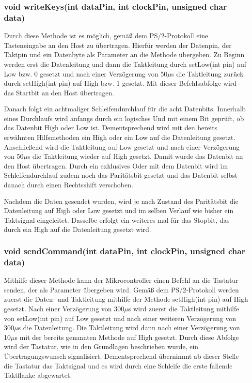 \subsubsection{void writeKeys(int dataPin, int clockPin, unsigned char data)}
Durch diese Methode ist es möglich, gemäß dem PS/2-Protokoll eine Tasteneingabe an den Host zu übertragen. Hierfür werden der Datenpin, der Taktpin und ein Datenbyte als Parameter an die Methode übergeben. Zu Beginn werden erst die Datenleitung und dann die Taktleitung durch setLow(int pin) auf Low bzw. 0 gesetzt und nach einer Verzögerung von 50$\mu$s die Taktleitung zurück durch setHigh(int pin) auf High bzw. 1 gesetzt. Mit dieser Befehlsabfolge wird das Startbit an den Host übertragen.

Danach folgt ein achtmaliger Schleifendurchlauf für die acht Datenbits. Innerhalb eines Durchlaufs wird anfangs durch ein logisches Und mit einem Bit geprüft, ob das Datenbit High oder Low ist. Dementsprechend wird mit den bereits erwähnten Hilfsmethoden ein High oder ein Low auf die Datenleitung gesetzt. Anschließend wird die Taktleitung auf Low gesetzt und nach einer Verzögerung von 50$\mu$s die Taktleitung wieder auf High gesetzt. Damit wurde das Datenbit an den Host übertragen. Durch ein exklusives Oder mit dem Datenbit wird im Schleifendurchlauf zudem noch das Paritätsbit gesetzt und das Datenbit selbst danach durch einen Rechtsshift verschoben.

Nachdem die Daten gesendet wurden, wird je nach Zustand des Paritätsbit die Datenleitung auf High oder Low gesetzt und im selben Verlauf wie bisher ein Taktsignal eingeleitet. Dasselbe erfolgt ein weiteres mal für das Stopbit, das durch ein High auf die Datenleitung gesetzt wird.

\subsubsection{void sendCommand(int dataPin, int clockPin, unsigned char data)}
Mithilfe dieser Methode kann der Mikrocontroller einen Befehl an die Tastatur senden, der als Parameter übergeben wird. Gemäß dem PS/2-Protokoll werden zuerst die Daten- und Taktleitung mithilfe der Methode setHigh(int pin) auf High gesetzt. Nach einer Verzögerung von 300$\mu$s wird zuerst die Taktleitung mithilfe von setLow(int pin) auf Low gesetzt und nach einer weiteren Verzögerung von 300$\mu$s die Datenleitung. Die Taktleitung wird dann nach einer Verzögerung von 10$\mu$s mit der bereits genannten Methode auf High gesetzt. Durch diese Abfolge wird der Tastatur, wie in den Grundlagen beschrieben wurde, ein Übertragungswunsch signalisiert. Dementsprechend übernimmt ab dieser Stelle die Tastatur das Taktsignal und es wird durch eine Schleife die erste fallende Taktflanke abgewartet.

